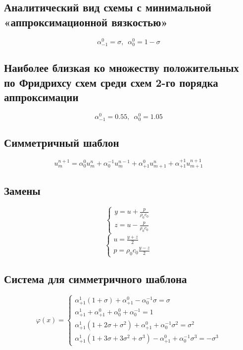 \documentclass[a4paper, 12pt]{article} %
\begin{document}

\subsection{Аналитический вид схемы с минимальной «аппроксимационной вязкостью»}
\label{subsec:4t}
$$\alpha^{0}_{-1} = \sigma, \,\,\, \alpha^{0}_{0} = 1-\sigma$$

\subsection{Наиболее близкая ко множеству положительных по Фридрихсу схем среди схем 2-го порядка аппроксимации}
\label{subsec:5t}
$$\alpha^{0}_{-1} = 0.55, \,\,\, \alpha^{0}_{0} = 1.05$$

\subsection{Симметричный шаблон}
\label{subsec:6t}
$$u^{n+1}_{m} = \alpha^{0}_{0}u^{n}_{m} + \alpha^{-1}_{0}u^{n-1}_{m} + \alpha^{0}_{+1}u^{n}_{m+1} + \alpha^{+1}_{+1}u^{n+1}_{m+1}$$

\subsection{Замены}
\begin{equation*}
 \begin{cases}
   y = u + \frac{p}{\rho_0 c_0} \\
   z = u - \frac{p}{\rho_0 c_0}
\end{cases}
\end{equation*}
\begin{equation*}
 \begin{cases}
   u = \frac{y+z}{2} \\
   p = \rho_0 c_0 \frac{y-z}{2}
\end{cases}
\end{equation*}

\subsection{Система для симметричного шаблона}
\begin{equation*}
\varphi(x) = 
 \begin{cases}
 	\alpha^{1}_{+1}\left(1 + \sigma \right) + \alpha^{0}_{+1} - \alpha^{-1}_{0} \sigma = \sigma  \\  
 	\alpha^{1}_{+1} + \alpha^{0}_{+1} + \alpha^{0}_{0} + \alpha^{-1}_{0}  = 1 \\
 	\alpha^{1}_{+1} \left( 1 + 2\sigma + \sigma^2 \right) + \alpha^{0}_{+1} + \alpha^{-1}_{0}\sigma^2 = \sigma^2 \\
 	\alpha^{1}_{+1} \left( 1 + 3\sigma + 3\sigma^2 + \sigma^3 \right) - \alpha^{0}_{+1} + \alpha^{-1}_{0}\sigma^3 = -\sigma^3 
 \end{cases}
\end{equation*}
\end{document}
